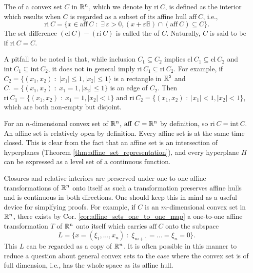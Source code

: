 \documentclass[11pt,a4paper]{article}
\begin{document}
\begin{definition}
    The  of a convex set $C$ in $\mathbb{R}^n$, which we denote by $\mathrm{ri}\ C$, is defined as the interior which results when $C$ is regarded as a subset of its affine hull $\mathrm{aff}\ C$, i.e.,
    \begin{equation*}
        \mathrm{ri}\ C = \{x\in \mathrm{aff}\ C\;:\; \exists\ \varepsilon>0, (x+\varepsilon \mathbb{B})\cap (\mathrm{aff}\ C)\subseteq C\}.
    \end{equation*}
    The set difference $(\mathrm{cl}\ C) - (\mathrm{ri}\ C)$ is called the  of $C$. Naturally, $C$ is said to be  if $\mathrm{ri}\ C = C$.
\end{definition}

\begin{remark}
    A pitfall to be noted is that, while inclusion $C_1\subseteq C_2$ implies $\mathrm{cl}\ C_1\subseteq \mathrm{cl}\ C_2$ and $\mathrm{int}\ C_1\subseteq \mathrm{int}\ C_2$, it does not in general imply $\mathrm{ri}\ C_1\subseteq \mathrm{ri}\ C_2$. For example, if $C_2 = \{(x_1,x_2)\;:\;|x_1|\le 1,|x_2|\le 1\}$ is a rectangle in $\mathbb{R}^2$ and $C_1 = \{(x_1,x_2)\;:\;x_1 = 1,|x_2|\le 1\}$ is an edge of $C_2$. Then $\mathrm{ri}\ C_1 = \{(x_1,x_2)\;:\;x_1 = 1,|x_2|< 1\}$ and $\mathrm{ri}\ C_2 = \{(x_1,x_2)\;:\;|x_1|< 1,|x_2|<1\}$, which are both non-empty but disjoint.
\end{remark}

\begin{remark}
    For an $n$-dimensional convex set of $\mathbb{R}^n$, $\mathrm{aff}\ C = \mathbb{R}^n$ by definition, so $\mathrm{ri}\ C = \mathrm{int}\ C$. An affine set is relatively open by definition. Every affine set is at the same time closed. This is clear from the fact that an affine set is an intersection of hyperplanes (Theorem \ref{thm:affine_set_representation}), and every hyperplane $H$ can be expressed as a level set of a continuous function.
\end{remark}

\begin{remark}\label{remark:simplying_ri_cl}
    Closures and relative interiors are preserved under one-to-one affine transformations of $\mathbb{R}^n$ onto itself as such a transformation preserves affine hulls and is continuous in both directions. One should keep this in mind as a useful device for simplfying proofs. For example, if $C$ is an $m$-dimensional convex set in $\mathbb{R}^n$, there exists by Cor. \ref{cor:affine_sets_one_to_one_map} a one-to-one affine transformation $T$ of $\mathbb{R}^n$ onto itself which carries $\mathrm{aff}\ C$ onto the subspace 
    \begin{equation*}
        L = \{x = (\xi_1,\ldots,x_n)\;:\;\xi_{m+1} = \ldots = \xi_{n} = 0\}.
    \end{equation*}
    This $L$ can be regarded as a copy of $\mathbb{R}^n$. It is often possible in this manner to reduce a question about general convex sets to the case where the convex set is of full dimension, i.e., has the whole space as its affine hull. 
\end{remark}
\end{document}
